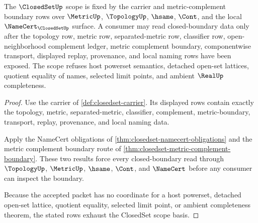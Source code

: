 \begin{theorem}\label{thm:closedset-scope-basis}
The $\ClosedSetUp$ scope is fixed by the carrier and metric-complement boundary rows over $\MetricUp$, $\TopologyUp$, $\hsame$, $\Cont$, and the local $\NameCert_{\ClosedSetUp}$ surface. A consumer may read closed-boundary data only after the topology row, metric row, separated-metric row, classifier row, open-neighborhood complement ledger, metric complement boundary, componentwise transport, displayed replay, provenance, and local naming rows have been exposed. The scope refuses host powerset semantics, detached open-set lattices, quotient equality of names, selected limit points, and ambient $\RealUp$ completeness.
\end{theorem}
\begin{proof}
Use the carrier of \autoref{def:closedset-carrier}. Its displayed rows contain exactly the topology, metric, separated-metric, classifier, complement, metric-boundary, transport, replay, provenance, and local naming data.

Apply the NameCert obligations of \autoref{thm:closedset-namecert-obligations} and the metric complement boundary route of \autoref{thm:closedset-metric-complement-boundary}. These two results force every closed-boundary read through $\TopologyUp$, $\MetricUp$, $\hsame$, $\Cont$, and $\NameCert$ before any consumer can inspect the boundary.

Because the accepted packet has no coordinate for a host powerset, detached open-set lattice, quotient equality, selected limit point, or ambient completeness theorem, the stated rows exhaust the ClosedSet scope basis.
\end{proof}

